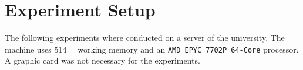 \section{Experiment Setup}\label{sec:experiment-setup} %
The following experiments where conducted on a server of the university. The machine uses \SI{514}{\gibi\byte} working memory and an \texttt{AMD EPYC 7702P 64-Core} processor. A graphic card was not necessary for the experiments.

